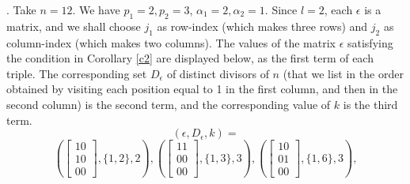 \documentclass{amsart}
\numberwithin{equation}{section}
\theoremstyle{definition}
\begin{document}
. Take $n=12$. We have $p_1=2, p_2=3$, $\alpha_1=2, \alpha_2=1$. Since $l=2$, each $\epsilon$ is a matrix, and we shall choose $j_1$ as row-index (which makes three rows) and $j_2$ as column-index (which makes two columns). The values of the matrix $\epsilon$ satisfying the condition in Corollary \ref{c2} 
are displayed below, as the first term of each triple. The corresponding set $D_\epsilon$ of distinct divisors of $n$ (that we list in the order obtained by visiting each position equal to 1 in the first column, and then in the second column) is the second term, and the corresponding value of $k$ is the third term.\\ $$(\epsilon,D_\epsilon,k)=$$$$\left(\left[\begin{array}{l}10\\10\\00\end{array}\right],\{1,2\},2\right),\left(\left[\begin{array}{l}11\\00\\00\end{array}\right],\{1,3\},3\right),\left(\left[\begin{array}{l}10\\01\\00\end{array}\right],\{1,6\},3\right),$$$$\le
\end{document}
